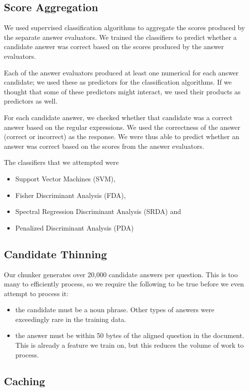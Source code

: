 \documentclass{article}
\begin{document}
\subsection{Score Aggregation}
We used supervised classification algorithms to aggregate the scores produced
by the separate answer evaluators. We trained the classifiers to predict whether
a candidate answer was correct based on the scores produced by the answer evaluators.

Each of the answer evaluators produced at least one numerical for each answer
candidate; we used these as predictors for the classification algorithms.
If we thought that some of these predictors might interact, we used their products
as predictors as well.

For each candidate answer, we checked whether that candidate was a correct answer based on
the regular expressions. We used the correctness of the answer (correct or incorrect)
as the response. We were thus able to predict whether an answer was correct
based on the scores from the answer evaluators.

The classifiers that we attempted were
\begin{itemize}
\item Support Vector Machines (SVM),
\item Fisher Discriminant Analysis (FDA),
\item Spectral Regression Discriminant Analysis (SRDA) and
\item Penalized Discriminant Analysis (PDA)
\end{itemize}

\subsection{Candidate Thinning}

Our chunker generates over 20,000 candidate answers per question.  This is too
many to efficiently process, so we require the following to be true before we
even attempt to process it:
\begin{itemize}
\item the candidate must be a noun phrase.  Other types of answers were
exceedingly rare in the training data.
\item the answer must be within 50 bytes of the aligned question in the
document.  This is already a feature we train on, but this reduces the volume of
work to process.
\end{itemize}

\subsection{Caching}
\end{document}
